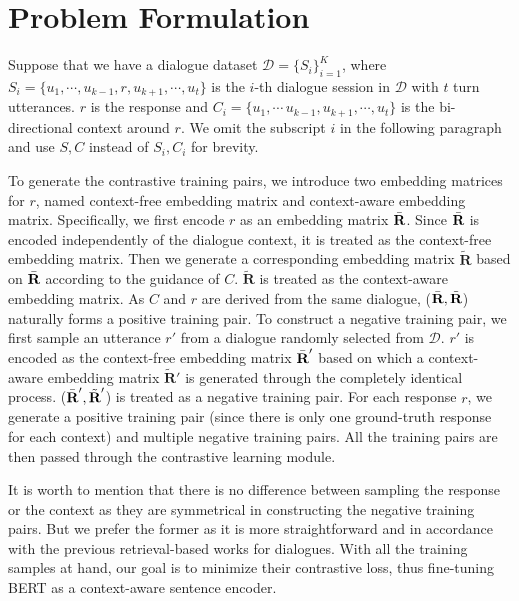 \documentclass[11pt]{article}
\begin{document}
\vspace{1cm}

\section{Problem Formulation}
Suppose that we have a dialogue dataset $\mathcal{D}=\{ S_{i} \}_{i=1}^{K}$, where $S_{i}=\{u_{1}, \cdots, u_{k-1}, r, u_{k+1}, \cdots, u_{t}\}$ is the $i$-th dialogue session in $\mathcal{D}$ with $t$ turn utterances.
$r$ is the response and $C_{i}=\{u_{1}, \cdots\, u_{k-1}, u_{k+1}, \cdots, u_{t}\}$ is the bi-directional context around $r$.
We omit the subscript $i$ in the following paragraph and use $S, C$ instead of $S_{i}, C_{i}$ for brevity.

To generate the contrastive training pairs, we introduce two embedding matrices for $r$, named context-free embedding matrix and context-aware embedding matrix.
Specifically, we first encode $r$ as an embedding matrix $\Bar{\textbf{R}}$.
Since $\Bar{\textbf{R}}$ is encoded independently of the dialogue context, it is treated as the context-free embedding matrix.
Then we generate a corresponding embedding matrix $\tilde{\textbf{R}}$ based on $\Bar{\textbf{R}}$ according to the guidance of $C$.
$\tilde{\textbf{R}}$ is treated as the context-aware embedding matrix.
As $C$ and $r$ are derived from the same dialogue, ($\Bar{\textbf{R}}, \tilde{\textbf{R}}$) naturally forms a positive training pair.
To construct a negative training pair, we first sample an utterance $r'$ from a dialogue randomly selected from $\mathcal{D}$.
$r'$ is encoded as the context-free embedding matrix $\Bar{\textbf{R}}'$ based on which a context-aware embedding matrix $\tilde{\textbf{R}}'$ is generated through the completely identical process.
($\Bar{\textbf{R}}', \tilde{\textbf{R}}'$) is treated as a negative training pair.
For each response $r$, we generate a positive training pair (since there is only one ground-truth response for each context) and multiple negative training pairs.
All the training pairs are then passed through the contrastive learning module.

It is worth to mention that there is no difference between sampling the response or the context as they are symmetrical in constructing the negative training pairs.
But we prefer the former as it is more straightforward and in accordance with the previous retrieval-based works for dialogues.
With all the training samples at hand, our goal is to minimize their contrastive loss, thus fine-tuning BERT as a context-aware sentence encoder.
\end{document}
